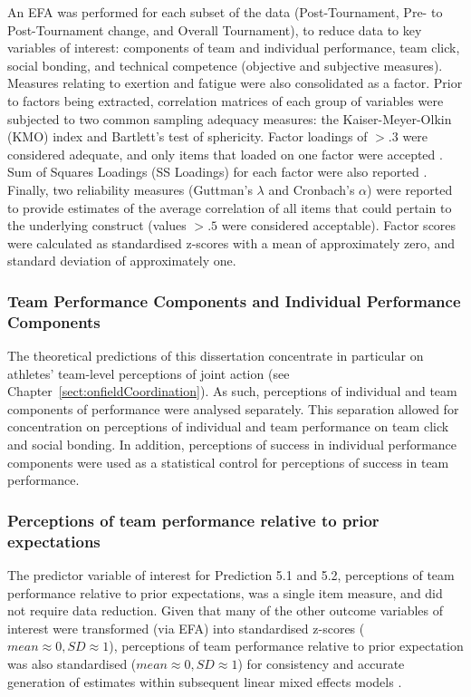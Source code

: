 \begin{CJK}{UTF8}{gbsn}
An EFA was performed for each subset of the data (Post-Tournament, Pre- to Post-Tournament change, and Overall Tournament), to reduce data to key variables of interest: components of team and individual performance, team click, social bonding, and technical competence (objective and subjective measures).  Measures relating to exertion and fatigue were also consolidated as a factor.  Prior to factors being extracted, correlation matrices of each group of variables were subjected to two common sampling adequacy measures: the Kaiser-Meyer-Olkin (KMO) index and Bartlett's test of sphericity.  Factor loadings of $> .3$ were considered adequate, and only items that loaded on one factor were accepted \citep{Field2012}.  Sum of Squares Loadings (SS Loadings) for each factor were also reported \citep{Dziuban1974}.  Finally, two reliability measures (Guttman's $\lambda$ and Cronbach's $\alpha$) were reported to provide estimates of the average correlation of all items that could pertain to the underlying construct (values  $> .5$ were considered acceptable).  Factor scores were calculated as standardised z-scores with a mean of approximately zero, and standard deviation of approximately one.

\subsubsection{Team Performance Components and Individual Performance Components}
The theoretical predictions of this dissertation concentrate in particular on athletes' team-level perceptions of joint action (see Chapter~\ref{sect:onfieldCoordination}).  As such, perceptions of individual and team components of performance were analysed separately.  This separation allowed for concentration on perceptions of individual and team performance on team click and social bonding. In addition, perceptions of success in individual performance components were used as a statistical control for perceptions of success in team performance.


\subsubsection{Perceptions of team performance relative to prior expectations}
The predictor variable of interest for Prediction 5.1 and 5.2, perceptions of team performance relative to prior expectations, was a single item measure, and did not require data reduction.  Given that many of the other outcome variables of interest were transformed (via EFA) into standardised z-scores ($mean \approx 0, SD \approx 1$), perceptions of team performance relative to prior expectation was also standardised ($mean \approx 0, SD \approx 1$) for consistency and accurate generation of estimates within subsequent linear mixed effects models \citep{Bates2015}.


\end{CJK}
